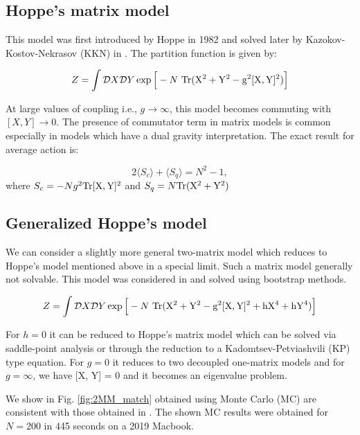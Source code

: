 \documentclass[11pt]{article}
\begin{document}
\subsection{Hoppe's matrix model}

This model was first introduced by Hoppe in 1982 and solved later by 
Kazokov-Kostov-Nekrasov (KKN) in \cite{Kazakov:1998ji}. The partition function is given by:

\begin{equation}
Z = \int \mathcal{D}X \mathcal{D}Y \exp \Big[-N ~ \rm{Tr} (X^2 + Y^2 - g^2 [X,Y]^2) \Big] 
\end{equation}

At large values of coupling i.e., $ g \to \infty$, this model becomes commuting with 
$ [X,Y] \to 0$. The presence of commutator term in matrix models is common especially in models which have a dual gravity interpretation. 
The exact result for average action is:

\begin{equation}
	2 \langle S_{c} \rangle + \langle S_{q}  \rangle = N^2 - 1, 
\end{equation}
where $ S_{c} = -Ng^2 \rm{Tr}[X,Y]^2$  and 
$ S_{q} = N \rm{Tr} (X^2 + Y^2) $

\subsection{Generalized Hoppe's model}

We can consider a slightly more general two-matrix model which reduces to 
Hoppe's model mentioned above in a special limit. Such a matrix model generally not solvable. 
This model was considered in \cite{Kazakov:2021lel} and solved using bootstrap methods. 

\begin{equation}
\label{eq:GHM1} 
Z = \int \mathcal{D}X \mathcal{D}Y \exp \Big[-N ~ \rm{Tr} (X^2 + Y^2 - g^2 [X,Y]^2 + hX^4 + hY^4) \Big]	
\end{equation} 

For $h = 0$ it can be reduced to Hoppe's matrix model which can be solved via saddle-point analysis or through the reduction to a Kadomtsev-Petviashvili (KP) type equation. For $g = 0$ it reduces to two decoupled one-matrix models and for $g = \infty$, we have [X, Y] = 0 and it becomes an eigenvalue problem. 

We show in Fig. \ref{fig:2MM_match} obtained using Monte Carlo (MC) are 
consistent with those obtained in \cite{Kazakov:2021lel}. The shown MC 
results were obtained for $N=200$ in 445 seconds on a 2019 Macbook. 
\end{document}
